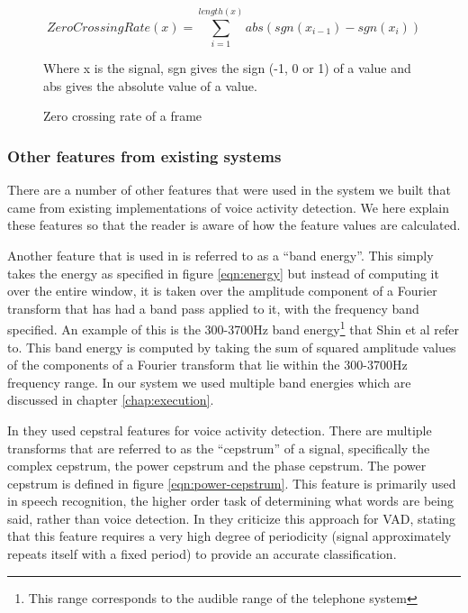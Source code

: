 \documentclass[ %
                    author={Sam Phippen},
                supervisor={Dr. Rafal Bogacz},
                     title={Real time voice activity detectors in noisy personal computing environments},
                  subtitle={},
                    degree={MEng},
                      year={2012} ]{thesis}
\begin{document}
\begin{figure}

    $$ZeroCrossingRate(x) =
    \sum_{i=1}^{length(x)}abs(sgn(x_{i-1})-sgn(x_i))$$


    Where x is the signal, sgn gives the sign (-1, 0 or 1) of a value and
    abs gives the absolute value of a value.

    \caption{Zero crossing rate of a frame}
    \label{eqn:zero-crossing-rate}
\end{figure}

\subsubsection{Other features from existing systems}

There are a number of other features that were used in the system we built that
came from existing implementations of voice activity detection. We here explain
these features so that the reader is aware of how the feature values are
calculated.

Another feature that is used in \cite{shin} is referred to as a ``band energy''.
This simply takes the energy as specified in figure \ref{eqn:energy} but
instead of computing it over the entire window, it is taken over the amplitude
component of a Fourier transform that has had a band pass applied to it, with
the frequency band specified.  An example of this is the
300-3700Hz band energy\footnote{This range corresponds to the audible range of the
telephone system} that Shin et al refer to. This band energy is
computed by taking the sum of squared amplitude values of the components of a
Fourier transform that lie within the 300-3700Hz frequency range. In our system
we used multiple band energies which are discussed in chapter
\ref{chap:execution}.

In \cite{haigh} they used cepstral features for voice activity detection. There
are multiple transforms that are referred to as the ``cepstrum'' of a signal,
specifically the complex cepstrum, the power cepstrum and the phase
cepstrum\cite{childers}. The power cepstrum is defined in figure
\ref{eqn:power-cepstrum}. This feature is primarily used in speech recognition,
the higher order task of determining what words are being said, rather than
voice detection\cite{muda}. In \cite{atal} they criticize this approach for
VAD, stating that this feature requires a very high degree of periodicity
(signal approximately repeats itself with a fixed period) to provide an
accurate classification.
\end{document}
